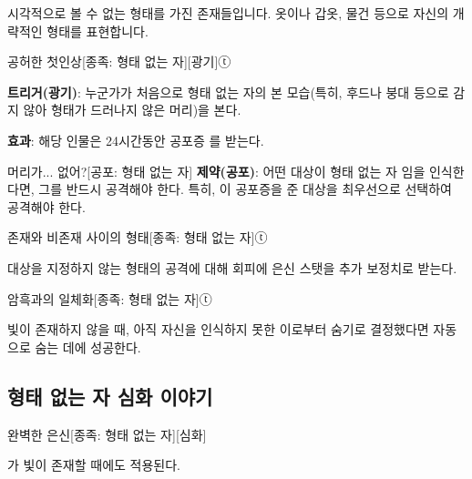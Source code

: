 \documentclass{report}
\begin{document}
	시각적으로 볼 수 없는 형태를 가진 존재들입니다. 옷이나 갑옷, 물건 등으로 자신의 개략적인 형태를 표현합니다.
	
	\begin{story}{공허한 첫인상}{[종족: 형태 없는 자][광기]ⓣ}
		
		\textbf{트리거(광기)}: 누군가가 처음으로 형태 없는 자의 본 모습(특히, 후드나 붕대 등으로 감지 않아 형태가 드러나지 않은 머리)을 본다.
		
		\textbf{효과}: 해당 인물은 24시간동안 공포증 를 받는다.
		
	\end{story}
	
	\begin{story}{머리가... 없어?}{[공포: 형태 없는 자]}
		\textbf{제약(공포)}: 어떤 대상이 형태 없는 자 임을 인식한다면, 그를 반드시 공격해야 한다. 특히, 이 공포증을 준 대상을 최우선으로 선택하여 공격해야 한다.
		
	\end{story}
	
	\begin{story}{존재와 비존재 사이의 형태}{[종족: 형태 없는 자]ⓣ}
		
		대상을 지정하지 않는 형태의 공격에 대해 회피에 은신 스탯을 추가 보정치로 받는다.
		
	\end{story}
	
	\begin{story}{암흑과의 일체화}{[종족: 형태 없는 자]ⓣ}
		
		빛이 존재하지 않을 때, 아직 자신을 인식하지 못한 이로부터 숨기로 결정했다면 자동으로 숨는 데에 성공한다.
		
	\end{story}
	
	\subsection{형태 없는 자 심화 이야기}
	
	\begin{story}{완벽한 은신}{[종족: 형태 없는 자][심화]}
		
		가 빛이 존재할 때에도 적용된다.
		
	\end{story}
\end{document}
